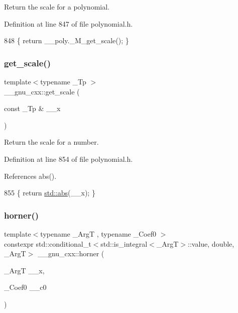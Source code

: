 Return the scale for a polynomial. 

Definition at line 847 of file polynomial.\+h.


\begin{DoxyCode}
848     \{ \textcolor{keywordflow}{return} \_\_poly.\_M\_get\_scale(); \}
\end{DoxyCode}
\mbox{\label{namespace____gnu__cxx_a1a8bae104a6509f4e458d155acaf0476}} 
\subsubsection{\texorpdfstring{get\+\_\+scale()}{get\_scale()}\hspace{0.1cm}{\footnotesize\ttfamily [2/2]}}
{\footnotesize\ttfamily template$<$typename \+\_\+\+Tp $>$ \\
\+\_\+\+\_\+gnu\+\_\+cxx\+::get\+\_\+scale (\begin{DoxyParamCaption}\item[{const \+\_\+\+Tp \&}]{\+\_\+\+\_\+x }\end{DoxyParamCaption})}

Return the scale for a number. 

Definition at line 854 of file polynomial.\+h.



References abs().


\begin{DoxyCode}
855     \{ \textcolor{keywordflow}{return} \hyperlink{namespace____gnu__cxx_ab9eb9db3560f504f8cd25a71bcb6ead5}{std::abs}(\_\_x); \}
\end{DoxyCode}
\mbox{\label{namespace____gnu__cxx_a2e77239e9d41f55a99755f285ba3d518}} 
\subsubsection{\texorpdfstring{horner()}{horner()}\hspace{0.1cm}{\footnotesize\ttfamily [1/2]}}
{\footnotesize\ttfamily template$<$typename \+\_\+\+ArgT , typename \+\_\+\+Coef0 $>$ \\
constexpr std\+::conditional\+\_\+t$<$std\+::is\+\_\+integral$<$\+\_\+\+ArgT$>$\+::value, double, \+\_\+\+ArgT$>$ \+\_\+\+\_\+gnu\+\_\+cxx\+::horner (\begin{DoxyParamCaption}\item[{\+\_\+\+ArgT}]{\+\_\+\+\_\+x,  }\item[{\+\_\+\+Coef0}]{\+\_\+\+\_\+c0 }\end{DoxyParamCaption})}

